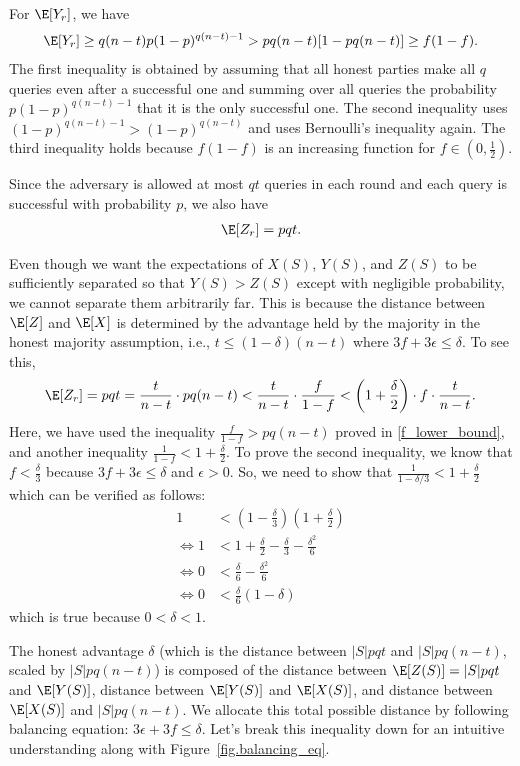 For $\E[Y_r]$, we have
\begin{align}
\label{eq:y_lower_bound}
    \E[Y_r]  \geq q(n-t)p (1-p)^{q(n-t)-1} > pq(n-t)[1-pq(n-t)] \geq f (1-f).
\end{align}
The first inequality is obtained by assuming that all honest parties make all $q$ queries even after a successful one and summing over all queries the probability $p(1-p)^{q(n-t)-1}$ that it is the only successful one.
The second inequality uses $(1-p)^{q(n-t)-1} > (1-p)^{q(n-t)}$ and uses Bernoulli's inequality again.
The third inequality holds because $f(1-f)$ is an increasing function for $f \in (0,\frac12)$.

Since the adversary is allowed at most $qt$ queries in each round and each query is successful with probability $p$, we also have
\begin{align}
    \E[Z_r] = pqt.
\end{align}

Even though we want the expectations of $X(S)$, $Y(S)$, and $Z(S)$ to be sufficiently separated so that $Y(S) > Z(S)$ except with negligible probability, we cannot separate them arbitrarily far. This is because the distance between $\E[Z]$ and $\E[X]$ is determined by the advantage held by the majority in the honest majority assumption, i.e., $t \leq (1-\delta)(n-t)$ where $3f+3\epsilon \leq \delta$.
To see this,
\begin{align}
    \E[Z_r] = pqt = \frac{t}{n-t} \cdot pq(n-t) < \frac{t}{n-t} \cdot \frac{f}{1-f} < \left(1+\frac{\delta}{2}\right)\cdot f \cdot \frac{t}{n-t}.
\end{align}
Here, we have used the inequality $\frac{f}{1-f} > pq(n-t)$ proved in \eqref{f_lower_bound}, and another inequality $\frac{1}{1-f} < 1 + \frac{\delta}{2}$. To prove the second inequality, we know that $f < \frac{\delta}{3}$ because $3f+3\epsilon \leq \delta$ and $\epsilon>0$. So, we need to show that $\frac{1}{1-\delta/3} < 1+\frac{\delta}{2}$ which can be verified as follows:
\begin{align*}
    1 &< \left(1-\frac{\delta}{3}\right) \left(1+\frac{\delta}{2}\right) \\
    \iff 1 &< 1 + \frac{\delta}{2} - \frac{\delta}{3} - \frac{\delta^2}{6} \\
    \iff 0 &< \frac{\delta}{6} - \frac{\delta^2}{6} \\
    \iff 0 &< \frac{\delta}{6}(1-\delta)
\end{align*}
which is true because $0 < \delta < 1$.

The honest advantage $\delta$ (which is the distance between $|S|pqt$ and $|S|pq(n-t)$, scaled by $|S|pq(n-t)$) is composed of the distance between $\E[Z(S)]=|S|pqt$ and $\E[Y(S)]$, distance between $\E[Y(S)]$ and $\E[X(S)]$, and distance between $\E[X(S)]$ and $|S|pq(n-t)$. We allocate this total possible distance by following balancing equation: $3\epsilon + 3f \leq \delta$. Let's break this inequality down for an intuitive understanding along with Figure~\ref{fig.balancing_eq}.

